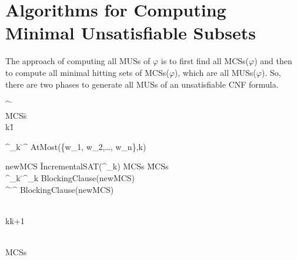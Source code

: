 \section{Algorithms for Computing Minimal Unsatisfiable Subsets}
\label{sec:algorithms for computing minimal unsatisfiable subset}
The approach of computing all MUSs of $\varphi$ is to first find all MCSs($\varphi$) and then to compute all minimal hitting sets of MCSs($\varphi$), which are all MUSs($\varphi$). So, there are two phases to generate all MUSs of an unsatisfiable CNF formula.
\begin{Algorithm}
	\caption{Algorithm for finding all MCSs of a formula $\varphi$}
	\label{alg:findmcses}
	\begin{algorithm}{}{}
		\varphi^{\prime} \=   \\
		MCSs\=\emptyset \\
		k\=1 \\
		\begin{WHILE}{}
			\varphi^{\prime}_{k} \= \varphi^{\prime} \wedge AtMost(\{\neg w_{1}, \neg w_{2},\ldots, \neg w_{n}\},k) \\
			\begin{WHILE}{newMCS \= IncrementalSAT(\varphi^{\prime}_{k})}
				MCSs \= MCSs  \\
				\varphi^{\prime}_{k} \= \varphi^{\prime}_{k} \wedge BlockingClause(newMCS) \\
				\varphi^{\prime} \= \varphi^{\prime} \wedge BlockingClause(newMCS) \\
			\end{WHILE} \\
			k\=k+1 \\
		\end{WHILE} \\
		\RETURN MCSs
	\end{algorithm}
\label{computing-mcs}
\end{Algorithm}

